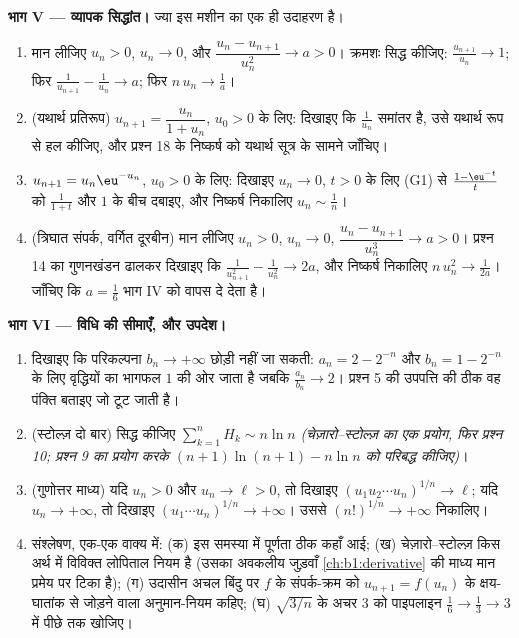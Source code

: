 \begin{problem}[{सप्ताहांत समस्या --- चेज़ारो--स्टोल्ज़ प्रमेय और $u_{n+1} = \sin
u_n$ के लिए अनंतस्पर्शी
$u_n \sim \sqrt{3/n}$}]
\medskip \noindent\textbf{भाग V --- व्यापक सिद्धांत।} ज्या इस मशीन का एक ही
उदाहरण है।
\begin{enumerate}[resume]
  \item मान लीजिए $u_n > 0$, $u_n \to 0$, और $\dfrac{u_n - u_{n+1}}{u_n^{2}}
  \to a > 0$। क्रमशः सिद्ध कीजिए: $\frac{u_{n+1}}{u_n} \to 1$; फिर
  $\frac{1}{u_{n+1}} - \frac{1}{u_n} \to a$; फिर $n\,u_n \to \frac1a$।
  \item (यथार्थ प्रतिरूप) $u_{n+1} = \dfrac{u_n}{1 + u_n}$, $u_0 > 0$ के
  लिए: दिखाइए कि $\frac{1}{u_n}$ समांतर है, उसे यथार्थ रूप से हल कीजिए, और
  प्रश्न 18 के निष्कर्ष को यथार्थ सूत्र के सामने जाँचिए।
  \item $u_{n+1} = u_n \eu^{-u_n}$, $u_0 > 0$ के लिए: दिखाइए $u_n \to 0$, $t
  > 0$ के लिए (G1) से $\frac{1 - \eu^{-t}}{t}$ को $\frac{1}{1+t}$ और $1$ के
  बीच दबाइए, और निष्कर्ष निकालिए $u_n \sim \frac 1n$।
  \item (त्रिघात संपर्क, वर्गित दूरबीन) मान लीजिए $u_n > 0$, $u_n \to 0$,
  $\dfrac{u_n - u_{n+1}}{u_n^{3}} \to a > 0$। प्रश्न 14 का गुणनखंडन ढालकर
  दिखाइए कि $\frac{1}{u_{n+1}^2} - \frac{1}{u_n^2} \to 2a$, और निष्कर्ष
  निकालिए $n\,u_n^{2} \to \frac{1}{2a}$। जाँचिए कि $a = \frac16$ भाग IV को
  वापस दे देता है।
\end{enumerate}

\medskip \noindent\textbf{भाग VI --- विधि की सीमाएँ, और उपदेश।}
\begin{enumerate}[resume]
  \item दिखाइए कि परिकल्पना $b_n \to +\infty$ छोड़ी नहीं जा सकती: $a_n = 2 -
  2^{-n}$ और $b_n = 1 - 2^{-n}$ के लिए वृद्धियों का भागफल $1$ की ओर जाता है
  जबकि $\frac{a_n} {b_n} \to 2$। प्रश्न 5 की उपपत्ति की ठीक वह पंक्ति बताइए
  जो टूट जाती है।
  \item (स्टोल्ज़ दो बार) सिद्ध कीजिए $\sum_{k=1}^{n} H_k \sim n \ln n$
  \emph{(चेज़ारो--स्टोल्ज़ का एक प्रयोग, फिर प्रश्न 10; प्रश्न 9 का प्रयोग
  करके $(n+1)\ln(n+1) - n\ln n$ को परिबद्ध कीजिए)}।
  \item (गुणोत्तर माध्य) यदि $u_n > 0$ और $u_n \to \ell > 0$, तो दिखाइए
  $(u_1 u_2 \cdots u_n)^{1/n} \to \ell$; यदि $u_n \to +\infty$, तो दिखाइए
  $(u_1 \cdots u_n)^{1/n} \to +\infty$। उससे $(n!)^{1/n} \to +\infty$
  निकालिए।
  \item संश्लेषण, एक-एक वाक्य में: (क) इस समस्या में पूर्णता ठीक कहाँ आई;
  (ख) चेज़ारो--स्टोल्ज़ किस अर्थ में विविक्त लोपिताल नियम है (उसका अवकलीय
  जुड़वाँ \cref{ch:b1:derivative} की माध्य मान प्रमेय पर टिका है); (ग)
  उदासीन अचल बिंदु पर $f$ के संपर्क-क्रम को $u_{n+1} = f(u_n)$ के
  क्षय-घातांक से जोड़ने वाला अनुमान-नियम कहिए; (घ) $\sqrt{3/n}$ के अचर $3$
  को पाइपलाइन $\frac16 \to \frac13 \to 3$ में पीछे तक खोजिए।
\end{enumerate}
\end{problem}
